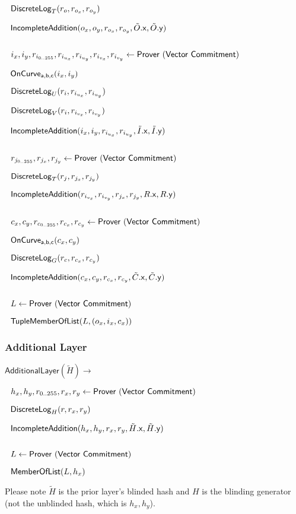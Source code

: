 \documentclass[]{article}
\begin{document}
$~~\mathsf{DiscreteLog}_T(r_o, r_{o_x}, r_{o_y})$

$~~\mathsf{IncompleteAddition}(o_x, o_y, r_{o_x}, r_{o_y}, \tilde{O}\mathsf{.x}, \tilde{O}\mathsf{.y})$

$ $

$~~i_x, i_y, r_{i_{0..255}}, r_{i_{u_x}}, r_{i_{u_y}}, r_{i_{v_x}}, r_{i_{v_y}}\leftarrow \mathsf{Prover ~(Vector ~Commitment)}$

$~~\mathsf{OnCurve_{a,b,c}}(i_x, i_y)$

$~~\mathsf{DiscreteLog}_U(r_i, r_{i_{u_x}}, r_{i_{u_y}})$

$~~\mathsf{DiscreteLog}_V(r_i, r_{i_{v_x}}, r_{i_{v_y}})$

$~~\mathsf{IncompleteAddition}(i_x, i_y, r_{i_{u_x}}, r_{i_{u_y}}, \tilde{I}\mathsf{.x}, \tilde{I}\mathsf{.y})$

$ $

$~~r_{j_{0..255}}, r_{j_x}, r_{j_y}\leftarrow \mathsf{Prover ~(Vector ~Commitment)}$

$~~\mathsf{DiscreteLog}_T(r_j, r_{j_x}, r_{j_y})$

$~~\mathsf{IncompleteAddition}(r_{i_{v_x}}, r_{i_{v_y}}, r_{j_x}, r_{j_y}, R\mathsf{.x}, R\mathsf{.y})$

$ $

$~~c_x, c_y, r_{c_{0..255}}, r_{c_x}, r_{c_y}\leftarrow \mathsf{Prover ~(Vector ~Commitment)}$

$~~\mathsf{OnCurve_{a,b,c}}(c_x, c_y)$

$~~\mathsf{DiscreteLog}_G(r_c, r_{c_x}, r_{c_y})$

$~~\mathsf{IncompleteAddition}(c_x, c_y, r_{c_x}, r_{c_y}, \tilde{C}\mathsf{.x}, \tilde{C}\mathsf{.y})$

$ $

$~~L\leftarrow \mathsf{Prover ~(Vector ~Commitment)}$

$~~\mathsf{TupleMemberOfList}(L, (o_x, i_x, c_x))$

\subsubsection{Additional Layer}

$\mathsf{AdditionalLayer}(\tilde{H}) \rightarrow$

$~~h_x, h_y, r_{0..255}, r_x, r_y\leftarrow \mathsf{Prover ~(Vector ~Commitment)}$

$~~\mathsf{DiscreteLog}_H(r, r_x, r_y)$

$~~\mathsf{IncompleteAddition}(h_x, h_y, r_x, r_y, \tilde{H}\mathsf{.x}, \tilde{H}\mathsf{.y})$

$ $

$~~L\leftarrow \mathsf{Prover ~(Vector ~Commitment)}$

$~~\mathsf{MemberOfList}(L, h_x)$

Please note $\tilde{H}$ is the prior layer's blinded hash and $H$ is the blinding generator (not the unblinded hash, which is $h_x, h_y$).
\end{document}
